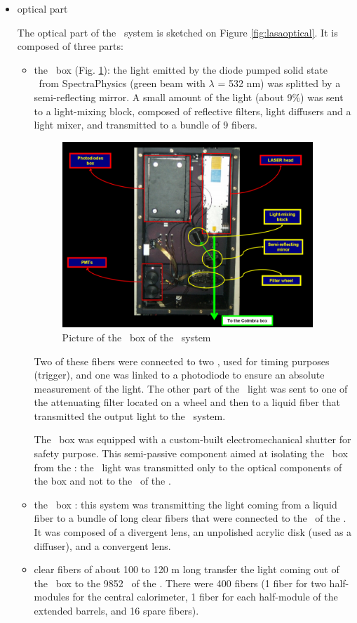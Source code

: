 \begin{itemize}
\item optical part 

	The optical part of the \lasi~system is sketched on Figure \ref{fig:lasaoptical}. It is composed of three parts:
	\begin{itemize}
	\item the \las~box (Fig. \ref{fig:lasabox}): the light emitted by the diode pumped solid state \las~from SpectraPhysics (green beam with $\lambda$ = 532 nm) was splitted by a semi-reflecting mirror. A small amount of the light (about 9\%) was sent to a light-mixing block, composed of reflective filters, light diffusers and a light mixer, and transmitted to a bundle of 9 fibers. \par
		\begin{figure}[htbp]
			\centering
			\includegraphics[height=7cm]{figures/LaserBox.png}
			\caption{Picture of the \las~box of the \lasi~system}\label{fig:lasabox}
		\end{figure}	
			
		Two of these fibers were connected to two \pmts, used for timing purposes (trigger), and one was linked to a photodiode to ensure an absolute measurement of the light. The other part of the \las~light was sent to one of the attenuating filter located on a wheel and then to a liquid fiber that transmitted the output light to the \coimbra~system. \par
                 The \las~box was equipped with a custom-built electromechanical shutter for safety purpose. This semi-passive component aimed at isolating the \las~box from the \tilecal: the \las~light was transmitted only to the optical components of the box and not to the \pmt~of the \tilecal. 

	\item the \coimbra~box : this system was transmitting the light coming from a liquid fiber to a bundle of long clear fibers that were connected to the \pmts~of the \tilecal. It was composed of a divergent lens, an unpolished acrylic disk (used as a diffuser), and a convergent lens.
	\item clear fibers of about 100 to 120 m long transfer the light coming out of the \coimbra~box to the 9852 \pmts~of the \tilecal. There were 400 fibers (1 fiber for two half-modules for the central calorimeter, 1 fiber for each half-module of the extended barrels, and 16 spare fibers). 
	\end{itemize}
		

\end{itemize}
